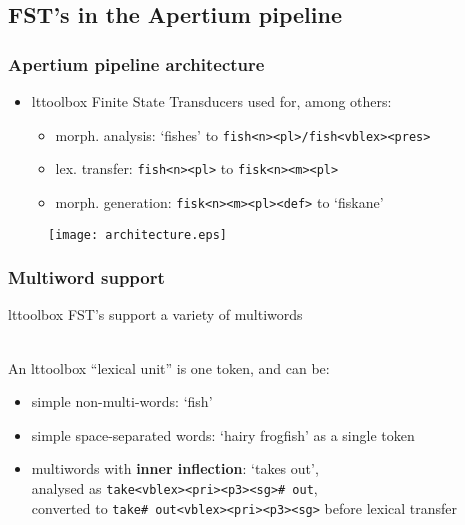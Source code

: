 \documentclass[notes=hide]{beamer}
\newcommand{\ana}[1]{\texttt{#1}}
\newcommand{\form}[1]{`#1'}
\begin{document}
\subsection{FST's in the Apertium pipeline}
\begin{frame}
  \frametitle{Apertium pipeline architecture}
  \begin{itemize}
    \item lttoolbox Finite State Transducers used for, among others:
      \begin{itemize}
      \item morph. analysis: \form{fishes} to \ana{fish<n><pl>/fish<vblex><pres>}
      \item lex. transfer: \ana{fish<n><pl>} to \ana{fisk<n><m><pl>}
      \item morph. generation: \ana{fisk<n><m><pl><def>} to \form{fiskane}
      \end{itemize}
  \end{itemize}
  \begin{figure}[h]
    \begin{center}
      \texttt{[image: architecture.eps]}
    \end{center}
  \end{figure}
\end{frame}

\begin{frame}
  \frametitle{Multiword support}
  lttoolbox FST's support a variety of multiwords

  ~ \\

  An lttoolbox ``lexical unit'' is one token, and can be:
  \begin{itemize}
  \item simple non-multi-words: \form{fish}
  \item simple space-separated words: \form{hairy frogfish} as a
    single token
  \item multiwords with \textbf{inner inflection}: \form{takes out}, \\
    analysed as \ana{take<vblex><pri><p3><sg>\# out},\\
    converted to \ana{take\# out<vblex><pri><p3><sg>} before lexical
    transfer
  \end{itemize}
\end{frame}
\end{document}
